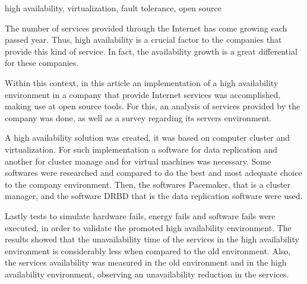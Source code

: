 \begin{englishabstract}{}{high availability, virtualization, fault tolerance, open source}

The number of services provided through the Internet has come growing each passed year. Thus, high availability is a crucial factor to the 
companies that provide this kind of service. In fact, the availability growth is a great differential for these companies.

Within this context, in this article an implementation of a high availability environment in a company that provide 
Internet services was accomplished, making use at open source tools. For this, an analysis of services provided by the company was done, 
as well as a survey regarding its servers environment.

A high availability solution was created, it was based on computer cluster and virtualization.
For such implementation a software for data replication and another for cluster manage and for virtual machines was necessary. 
Some softwares were researched and compared to do the best and most adequate choice to the company environment.
Then, the softwares Pacemaker, that is a cluster manager, and the software DRBD that is the data replication software were used.

Lastly tests to simulate hardware fails, energy fails and software fails were executed, in order to validate the promoted high availability
environment. The results showed that the unavailability time of the services in the high availability environment is considerably less when 
compared to the old environment. Also, the services availability was measured in the old environment and in the high availability environment, 
observing an unavailability reduction in the services.

\end{englishabstract}
